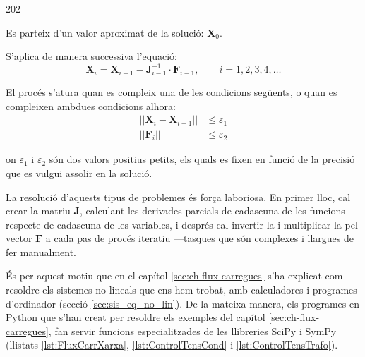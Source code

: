 \begin{dingautolist}{202}
	\item Es parteix d'un valor aproximat de la solució: $\boldsymbol{X}_0$.
	
	\item   S'aplica de manera successiva l'equació:
	\begin{equation}
		\boldsymbol{X}_i = \boldsymbol{X}_{i-1} - \boldsymbol{J}_{i-1}^{-1} \cdot \boldsymbol{F}_{i-1}, \qquad i=1,2,3,4, \dots
	\end{equation}
	
	\item   El procés s'atura quan es compleix una de les condicions següents, o quan es compleixen ambdues condicions alhora:
	\begin{subequations}\begin{align}
			||\boldsymbol{X}_i - \boldsymbol{X}_{i-1}|| &\leq \varepsilon_1 \\
			||\boldsymbol{F}_i|| &\leq \varepsilon_2
	\end{align}\end{subequations}
	
	on $\varepsilon_1$ i $\varepsilon_2$ són dos valors positius petits, els quals es fixen en funció de la precisió que es vulgui assolir en la solució.
\end{dingautolist}

La resolució d'aquests tipus de problemes és força laboriosa. En primer lloc, cal crear la matriu  $\boldsymbol{J}$, calculant les derivades parcials de cadascuna de les funcions respecte de cadascuna de les variables, i després  cal invertir-la i multiplicar-la pel vector $\boldsymbol{F}$ a cada pas de procés iteratiu ---tasques que són  complexes i llargues  de fer manualment.

És per aquest motiu que en el capítol \ref{sec:ch-flux-carregues}  s'ha explicat com resoldre els sistemes no lineals que ens hem trobat, amb calculadores i programes d'ordinador (secció \ref{sec:sis_eq_no_lin}). De la mateixa manera, els programes en Python que s'han creat  per resoldre els exemples del capítol \ref{sec:ch-flux-carregues},  fan servir funcions especialitzades de les llibreries SciPy i SymPy (llistats \ref{lst:FluxCarrXarxa}, \ref{lst:ControlTensCond} i \ref{lst:ControlTensTrafo}). 
